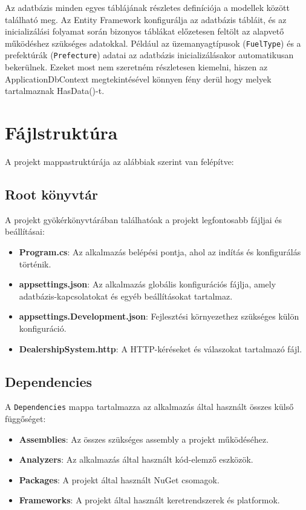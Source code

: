 \documentclass{report}[11pt]
\begin{document}
Az adatbázis minden egyes táblájának részletes definíciója a modellek között található meg. Az Entity Framework konfigurálja az adatbázis tábláit, és az inicializálási folyamat során bizonyos táblákat előzetesen feltölt az alapvető működéshez szükséges adatokkal. Például az üzemanyagtípusok (\texttt{FuelType}) és a prefektúrák (\texttt{Prefecture}) adatai az adatbázis inicializálásakor automatikusan bekerülnek.
Ezeket most nem szeretném részletesen kiemelni, hiszen az ApplicationDbContext megtekintésével könnyen fény derül hogy melyek tartalmaznak HasData()-t. 



\section{Fájlstruktúra}

A projekt mappastruktúrája az alábbiak szerint van felépítve:

\subsection{Root könyvtár}
A projekt gyökérkönyvtárában találhatóak a projekt legfontosabb fájljai és beállításai:

\begin{itemize}
    \item \textbf{Program.cs}: Az alkalmazás belépési pontja, ahol az indítás és konfigurálás történik.
    \item \textbf{appsettings.json}: Az alkalmazás globális konfigurációs fájlja, amely adatbázis-kapcsolatokat és egyéb beállításokat tartalmaz.
    \item \textbf{appsettings.Development.json}: Fejlesztési környezethez szükséges külön konfiguráció.
    \item \textbf{DealershipSystem.http}: A HTTP-kéréseket és válaszokat tartalmazó fájl.
\end{itemize}

\subsection{Dependencies}
A \texttt{Dependencies} mappa tartalmazza az alkalmazás által használt összes külső függőséget:

\begin{itemize}
    \item \textbf{Assemblies}: Az összes szükséges assembly a projekt működéséhez.
    \item \textbf{Analyzers}: Az alkalmazás által használt kód-elemző eszközök.
    \item \textbf{Packages}: A projekt által használt NuGet csomagok.
    \item \textbf{Frameworks}: A projekt által használt keretrendszerek és platformok.
\end{itemize}
\end{document}
